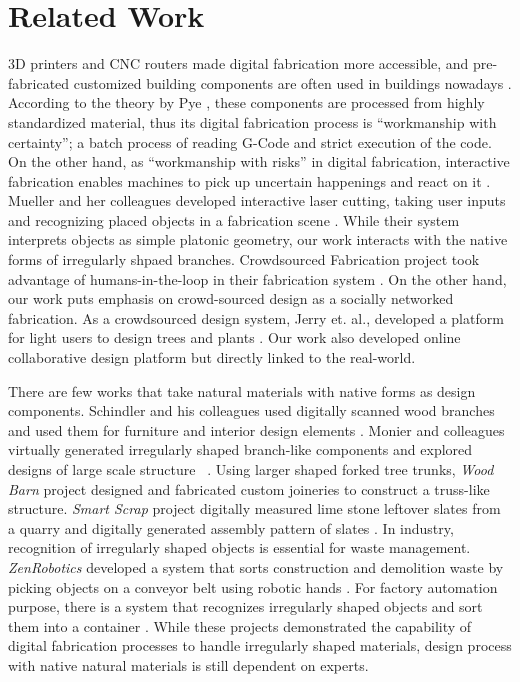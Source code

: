 \section{Related Work}
3D printers and CNC routers made digital fabrication more accessible, and pre-fabricated customized building components are often used in buildings nowadays \cite{knaack2012prefabricated}.
According to the theory by Pye , these components are processed from highly standardized material, thus its digital fabrication process is ``workmanship with certainty''; a batch process of reading G-Code and strict execution of the code.
On the other hand, as ``workmanship with risks'' in digital fabrication, interactive fabrication enables machines to pick up uncertain happenings and react on it \cite{willis2011interactive}.
Mueller and her colleagues developed interactive laser cutting, taking user inputs and recognizing placed objects in a fabrication scene \cite{Mueller:2012:ICI:2380116.2380191}.
While their system interprets objects as simple platonic geometry, our work interacts with the native forms of irregularly shpaed branches.
Crowdsourced Fabrication project took advantage of humans-in-the-loop in their fabrication system \cite{lafreniere2016crowdsourced}.
On the other hand, our work puts emphasis on crowd-sourced design as a socially networked fabrication.
As a crowdsourced design system, Jerry et. al., developed a platform for light users to design trees and plants \cite{talton2009exploratory}.
Our work also developed online collaborative design platform but directly linked to the real-world.

There are few works that take natural materials with native forms as design components.
Schindler and his colleagues used digitally scanned wood branches and used them for furniture and interior design elements \cite{schindler2014processing}.
Monier and colleagues virtually generated irregularly shaped branch-like components and explored designs of large scale structure ~\cite{monier2013use}.
Using larger shaped forked tree trunks, \textit{Wood Barn} project designed and fabricated custom joineries to construct a truss-like structure\cite{woodbarn}.
\textit{Smart Scrap} project digitally measured lime stone leftover slates from a quarry and digitally generated assembly pattern of slates \cite{smartscrap}.
In industry, recognition of irregularly shaped objects is essential for waste management.
\textit{ZenRobotics} developed a system that sorts construction and demolition waste by picking objects on a conveyor belt using robotic hands \cite{lukka2014zenrobotics}.
For factory automation purpose, there is a system that recognizes irregularly shaped objects and sort them into a container \cite{sujan2000design}.
While these projects demonstrated the capability of digital fabrication processes to handle irregularly shaped materials, design process with native natural materials is still dependent on experts.

